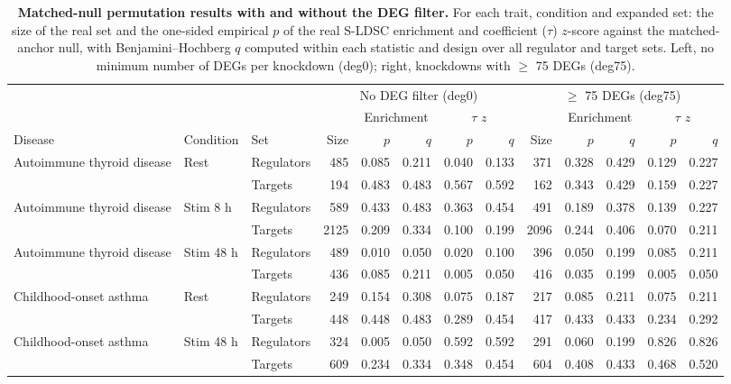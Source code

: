 \begin{table}[tbp]
\centering
\caption[Matched-null permutation results with and without the DEG filter]{\textbf{Matched-null permutation results with and without the DEG filter.} For each trait, condition and expanded set: the size of the real set and the one-sided empirical $p$ of the real S-LDSC enrichment and coefficient ($\tau$) $z$-score against the matched-anchor null, with Benjamini--Hochberg $q$ computed within each statistic and design over all regulator and target sets. Left, no minimum number of DEGs per knockdown (deg0); right, knockdowns with $\geq$ 75 DEGs (deg75).}
\label{tab:deg_filter_perm}
\vspace{4pt}
\small
\setlength{\tabcolsep}{3pt}
\begin{tabularx}{\linewidth}{@{}>{\raggedright\arraybackslash}X l l r r r r r r r r r r@{}}
\toprule
 & & & \multicolumn{5}{c}{No DEG filter (deg0)} & \multicolumn{5}{c}{$\geq$ 75 DEGs (deg75)} \\
\cmidrule(lr){4-8}\cmidrule(lr){9-13}
 & & &  & \multicolumn{2}{c}{Enrichment} & \multicolumn{2}{c}{$\tau$ $z$} &  & \multicolumn{2}{c}{Enrichment} & \multicolumn{2}{c}{$\tau$ $z$} \\
\cmidrule(lr){5-6}\cmidrule(lr){7-8}\cmidrule(lr){10-11}\cmidrule(lr){12-13}
Disease & Condition & Set & Size & $p$ & $q$ & $p$ & $q$ & Size & $p$ & $q$ & $p$ & $q$ \\
\midrule
Autoimmune thyroid disease & Rest & Regulators & 485 & 0.085 & 0.211 & 0.040 & 0.133 & 371 & 0.328 & 0.429 & 0.129 & 0.227 \\
 &  & Targets & 194 & 0.483 & 0.483 & 0.567 & 0.592 & 162 & 0.343 & 0.429 & 0.159 & 0.227 \\
\addlinespace
Autoimmune thyroid disease & Stim 8 h & Regulators & 589 & 0.433 & 0.483 & 0.363 & 0.454 & 491 & 0.189 & 0.378 & 0.139 & 0.227 \\
 &  & Targets & 2125 & 0.209 & 0.334 & 0.100 & 0.199 & 2096 & 0.244 & 0.406 & 0.070 & 0.211 \\
\addlinespace
Autoimmune thyroid disease & Stim 48 h & Regulators & 489 & 0.010 & 0.050 & 0.020 & 0.100 & 396 & 0.050 & 0.199 & 0.085 & 0.211 \\
 &  & Targets & 436 & 0.085 & 0.211 & 0.005 & 0.050 & 416 & 0.035 & 0.199 & 0.005 & 0.050 \\
\addlinespace
Childhood-onset asthma & Rest & Regulators & 249 & 0.154 & 0.308 & 0.075 & 0.187 & 217 & 0.085 & 0.211 & 0.075 & 0.211 \\
 &  & Targets & 448 & 0.448 & 0.483 & 0.289 & 0.454 & 417 & 0.433 & 0.433 & 0.234 & 0.292 \\
\addlinespace
Childhood-onset asthma & Stim 48 h & Regulators & 324 & 0.005 & 0.050 & 0.592 & 0.592 & 291 & 0.060 & 0.199 & 0.826 & 0.826 \\
 &  & Targets & 609 & 0.234 & 0.334 & 0.348 & 0.454 & 604 & 0.408 & 0.433 & 0.468 & 0.520 \\
\bottomrule
\end{tabularx}
\end{table}

